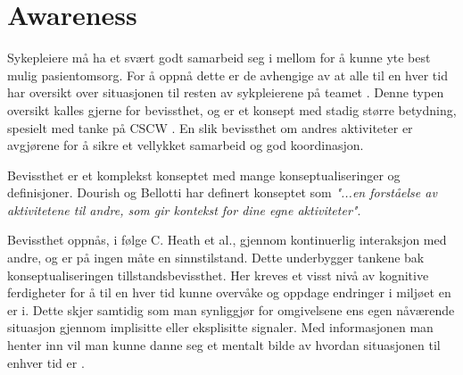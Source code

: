 \section{Awareness}
\label{chp: awareness}

Sykepleiere må ha et svært godt samarbeid seg i mellom for å kunne yte best mulig pasientomsorg. For å oppnå dette er de avhengige av at alle til en hver tid har oversikt over situasjonen til resten av sykpleierene på teamet \cite{Evjemo}. Denne typen oversikt kalles gjerne for bevissthet, og er et konsept med stadig større betydning, spesielt med tanke på CSCW \cite{Dourish92}. En slik bevissthet om andres aktiviteter er avgjørene for å sikre et vellykket samarbeid og god koordinasjon\cite{KlemetsRedundancy}. 

\noindent
Bevissthet er et komplekst konseptet \cite{KlemetsRedundancy}\cite{Gutwin04} med mange konseptualiseringer og definisjoner. Dourish og Bellotti har definert konseptet som \emph{"...en forståelse av aktivitetene til andre, som gir kontekst for dine egne aktiviteter"}. 


Bevissthet oppnås, i følge C. Heath et al., gjennom kontinuerlig interaksjon med andre, og er på ingen måte en sinnstilstand. Dette underbygger tankene bak konseptualiseringen tillstandsbevissthet. Her kreves et visst nivå av kognitive ferdigheter for å til en hver tid kunne overvåke og oppdage endringer i miljøet en er i. Dette skjer samtidig som man synliggjør for omgivelsene ens egen nåværende situasjon gjennom implisitte eller eksplisitte signaler. Med informasjonen man henter inn vil man kunne danne seg et mentalt bilde av hvordan situasjonen til enhver tid er \cite{Bardram04}. 
